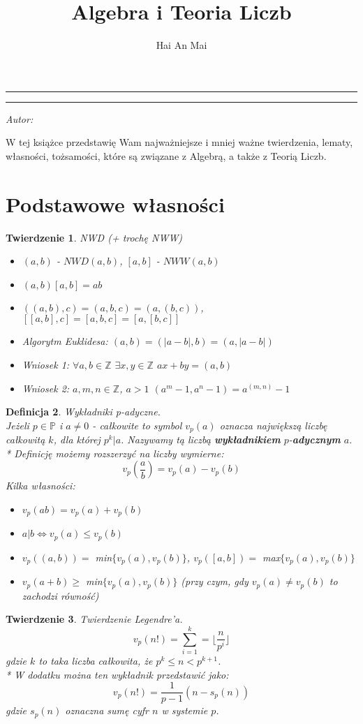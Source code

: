 \documentclass[10pt,a4paper]{article}
\author{Hai An Mai}
\title{Algebra i Teoria Liczb}
\makeatletter
\newcommand{\linia}{\rule{\linewidth}{0.4mm}}
\renewcommand{\maketitle}{\begin{titlepage}
    \vspace*{4cm}
    \vspace{3cm}
    \noindent\linia
    \begin{center}
      \LARGE \textsc{\@title}
         \end{center}
     \linia
    \vspace{0.5cm}
    \begin{flushright}
    \begin{minipage}{5cm}
    \textit{\small Autor:}\\
    \normalsize \textsc{\@author} \par
    \end{minipage}
    \vspace{5cm}
     \end{flushright}
    \vspace*{\stretch{6}}
  \end{titlepage}%
}
\newtheorem{theorem}{Twierdzenie}[section]
\newtheorem{defi}[theorem]{Definicja}
\newcommand{\Z}{\mathbb{Z}}
\newcommand{\p}{\mathbb{P}}
\makeatother
\begin{document}
\maketitle

W tej książce przedstawię Wam najważniejsze i mniej ważne twierdzenia, lematy, własności, tożsamości, które są związane z Algebrą, a także z Teorią Liczb.
\section{Podstawowe własności}
\color{red}
\begin{theorem}{NWD (+ trochę NWW)}
\color{black}
	\begin{itemize}
	\item 
	$(a,b)$ - $NWD(a,b)$, $[a,b]$ - $NWW(a,b)$
	\item 
	$(a,b)[a,b] = ab$
	\item 
	$((a,b),c) = (a,b,c) = (a,(b,c))$, $[[a,b],c]=[a,b,c]=[a,[b,c]]$
	\item 
	Algorytm Euklidesa: $(a,b)=(|a-b|,b)=(a,|a-b|)$
	\item 
	Wniosek 1: $\forall a,b \in \Z$ $\exists x,y \in \Z$ $ax+by = (a,b)$
	\item 
	Wniosek 2: $a,m,n \in \Z$, $ a>1$ $(a^m-1, a^n-1)=a^{(m,n)}-1$
	\end{itemize}
\end{theorem}

\begin{defi}{Wykładniki p-adyczne.}
\color{black}
\\
Jeżeli $p \in \p$ i $a \neq 0$ - całkowite to symbol $v_{p}(a)$ oznacza największą liczbę całkowitą $k$, dla której $p^k|a$. Nazywamy tą liczbą \textbf{wykładnikiem} $p$-\textbf{adycznym} $a$.
\\* Definicję możemy rozszerzyć na liczby wymierne:
$$v_p(\frac{a}{b})=v_p(a)-v_p(b)$$
Kilka własności:
\begin{itemize}
	\item 
	$v_p(ab) = v_p(a)+v_p(b)$
	\item 
	$a|b \Leftrightarrow v_p(a) \leq v_p(b)$
	\item 
	$v_p((a,b)) =$ min$\{v_p(a), v_p(b)\}$, $v_p([a,b]) =$ max$\{v_p(a), v_p(b)\}$ 
	\item 
	$v_p(a+b) \geq$ min$\{v_p(a), v_p(b)\}$ (przy czym, gdy $v_p(a) \neq v_p(b)$ to zachodzi równość)
\end{itemize}
\end{defi}
\begin{theorem}{Twierdzenie Legendre'a.}
\color{black}
$${v_p(n!) = \sum_{i=1}^{k} = \lfloor \frac{n}{p^i} \rfloor}$$ 
gdzie $k$ to taka liczba całkowita, że $p^k \leq n < p^{k+1}$.
\\* W dodatku można ten wykładnik przedstawić jako: 
$${v_p(n!) = \frac{1}{p-1}(n-s_p(n))}$$ gdzie $s_p(n)$ oznaczna sumę cyfr $n$ w systemie $p$.
\end{theorem}
\end{document}
